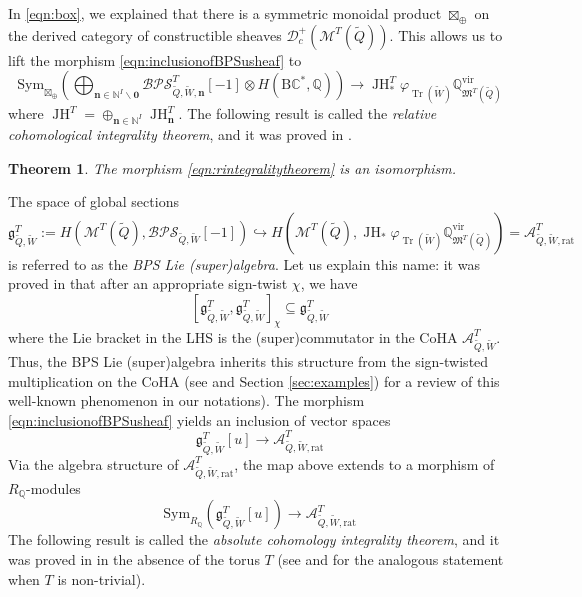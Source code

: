 \documentclass{amsart}
\newtheorem{theorem}{Theorem}[section]
\DeclareMathOperator{\Tr}{\mathrm{Tr}}
\def\vir{\mathrm{vir}}
\DeclareMathOperator{\JH}{\mathrm{JH}}
\def\nn{{\mathbb{N}^I}}
\def\bn{{\boldsymbol{n}}}
\def\b0{{\boldsymbol{0}}}
\def\tQ{\tilde{Q}}
\def\tW{\tilde{W}}
\def\khrat{\mathcal{A}^{T}_{\tQ,\tW,\text{rat}}}
\def\tbps{\mathfrak{g}^T_{\tilde{Q},\tilde{W}}}
\begin{document}
In \eqref{eqn:box}, we explained that there is a symmetric monoidal product $\boxtimes_{\oplus}$ on the derived category of constructible sheaves $\mathcal{D}^+_c(\mathcal{M}^T(\tilde{Q}))$. This allows us to lift the morphism \eqref{eqn:inclusionofBPSusheaf} to 
\begin{equation} 
\label{eqn:rintegralitytheorem}
\mathrm{Sym}_{\boxtimes_{\oplus}}\left(\bigoplus_{\bn \in \nn \backslash \b0} \mathcal{BPS}^T_{\tilde{Q},\tilde{W},\bn}[-1] \otimes H(\mathrm{B}\mathbb{C}^*,\mathbb{Q})\right)  \rightarrow \JH^T_*\varphi_{\Tr(\tilde{W})} \mathbb{Q}^{\vir}_{\mathfrak{M}^T(\tilde{Q})}
\end{equation}
where $\JH^T = \oplus_{\bn \in \nn} \JH^T_{\bn}$. The following result is called the \emph{relative cohomological integrality theorem}, and it was proved in \cite[Theorem A]{davison2020cohomological}.

\medskip 

\begin{theorem}

The morphism \eqref{eqn:rintegralitytheorem} is an isomorphism. 

\end{theorem}

\medskip

\noindent The space of global sections 
\[ 
\mathfrak{g}^T_{\tilde{Q},\tilde{W}}:= H(\mathcal{M}^T(\tilde{Q}), \mathcal{BPS}_{\tilde{Q},\tilde{W}}[-1]) \hookrightarrow H(\mathcal{M}^T(\tilde{Q}),\JH_{*}\varphi_{\Tr(\tilde{W})} \mathbb{Q}^{\vir}_{\mathfrak{M}^T(\tilde{Q})})= \khrat
\] 
is referred to as the \emph{BPS Lie (super)algebra}. Let us explain this name: it was proved in \cite[Corollary 6.11]{davison2020cohomological} that after an appropriate sign-twist $\chi$, we have
$$
[\tbps,\tbps]_{\chi} \subseteq \tbps
$$
where the Lie bracket in the LHS is the (super)commutator in the CoHA
$\mathcal{A}^T_{\tilde{Q},\tilde{W}}$. Thus, the BPS Lie (super)algebra inherits this structure from the sign-twisted multiplication on the CoHA (see \cite[Subsection 3.4.5]{jindalnegutbps} and Section \ref{sec:examples}) for a review of this well-known phenomenon in our notations). The morphism \eqref{eqn:inclusionofBPSusheaf} yields an inclusion of vector spaces
\begin{equation} 
\label{eqn:what is u}
\mathfrak{g}^T_{\tilde{Q},\tilde{W}}[u] \rightarrow \khrat
\end{equation}
Via the algebra structure of $\mathcal{A}^T_{\tilde{Q},\tilde{W},\text{rat}}$, the map above extends to a morphism of $R_{\mathbb{Q}}$-modules 
\begin{equation} \label{eqn:cohomologicalintegrality}
\mathrm{Sym}_{R_{\mathbb{Q}}}\left( \mathfrak{g}^T_{\tilde{Q},\tilde{W}}[u] \right)  \rightarrow  \khrat
\end{equation} 
The following result is called the \emph{absolute cohomology integrality theorem}, and it was proved in \cite[Theorem C]{davison2020cohomological} in the absence of the torus $T$ (see \cite{DW} and \cite{hennecart2026degenerationscohas2calabiyaucategories} for the analogous statement when $T$ is non-trivial). 
\end{document}
